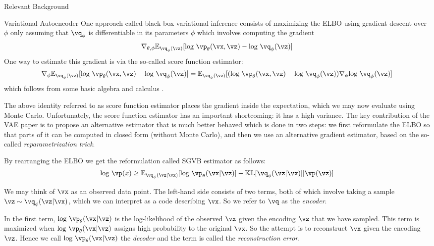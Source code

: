 \documentclass{article}
\begin{document}
\begin{psection}{Relevant Background}
\begin{psubsection}{Variational Autoencoder}
    One approach called black-box variational inference consists of maximizing the ELBO using gradient descent over $\phi$ only assuming that $\vq_\phi$ is differentiable in its parameters $\phi$ which involves computing the gradient
    \begin{align*}
        \nabla_{\theta,\phi} \mathbb{E}_{\vq_\phi(\vz)}[\text{log } \vp_\theta(\vx,\vz)-\text{log } \vq_\phi(\vz)]
    \end{align*}
    One way to estimate this gradient is via the so-called score function estimator:
    \begin{align*}
        \nabla_{\phi} \mathbb{E}_{\vq_\phi(\vz)}[\text{log } \vp_\theta(\vx,\vz)-\text{log } \vq_\phi(\vz)] =
        \mathbb{E}_{\vq_\phi(\vz)}[(\text{log } \vp_\theta(\vx,\vz)-\text{log } \vq_\phi(\vz))\nabla_{\phi}\text{log } \vq_\phi(\vz)]
    \end{align*}
    which follows from some basic algebra and calculus \citep{Mnih}.

    The above identity referred to as score function estimator places the gradient inside the expectation, which we may now evaluate using Monte Carlo. Unfortunately, the score function estimator has an important shortcoming: it has a high variance. The key contribution of the VAE paper \citep{VAE} is to propose an alternative estimator that is much better behaved which is done in two steps: we first reformulate the ELBO so that parts of it can be computed in closed form (without Monte Carlo), and then we use an alternative gradient estimator, based on the so-called \textit{reparametrization trick}.

    By rearranging the ELBO we get the reformulation called SGVB estimator as follows:
    \begin{align*}
        \text{log } \vp(x) \geq \mathbb{E}_{\vq_\phi(\vz|\vx)}[\text{log } \vp_\theta(\vx|\vz)]-\mathbb{KL}[\vq_\phi(\vz|\vx)||\vp(\vz)]
    \end{align*}

    We may think of $\vx$ as an observed data point. The left-hand side consists of two terms, both of which involve taking a sample $\vz \sim \vq_\phi(\vz|\vx)$, which we can interpret as a code describing $\vx$. So we refer to $\vq$ as the \textit{encoder}.

    In the first term, $\text{log } \vp_\theta(\vx|\vz)$ is the log-likelihood of the observed $\vx$ given the encoding $\vz$ that we have sampled. This term is maximized when $\text{log } \vp_\theta(\vx|\vz)$ assigns high probability to the original $\vx$. So the attempt is to reconstruct $\vx$ given the encoding $\vz$. Hence we call $\text{log } \vp_\theta(\vx|\vz)$ the \textit{decoder} and the term is called the \textit{reconstruction error}.


\end{psubsection}
\end{psection}
\end{document}
